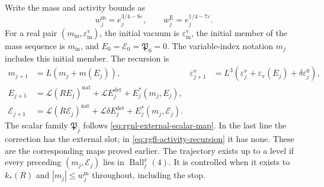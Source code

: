Write the mass and activity bounds as
\[
 w_j^{\mathrm m}=e_j^{3/4-8\varepsilon},\qquad
 w_j^{\mathrm E}=e_j^{1/4-7\varepsilon}.
\]
For a real pair $(m_{\mathrm{in}},\varepsilon_{\mathrm{in}}^{\mathrm v})$,
the initial vacuum is $\varepsilon_{\mathrm{in}}^{\mathrm v}$,
the initial member of the mass sequence is $m_{\mathrm{in}}$,
and $E_0=\mathscr E_0=\mathfrak P_0=0$.
The variable-index notation $m_j$ includes this initial member.
The recursion is
\begin{align}
 m_{j+1}&=L(m_j+m(E_j)),&
 \varepsilon_{j+1}^{\mathrm v}
       &=L^3(\varepsilon_j^{\mathrm v}
                 +\varepsilon_{\mathrm v}(E_j)+\delta\varepsilon_j^0),
                                      \label{eq:rgfl-coupling-recursion}\\
 E_{j+1}&=\mathcal L(RE_j)^{\mathrm{nat}}
                          +\mathcal LE_j^{\mathrm{det}}+E_j^*(m_j,E_j),
                                      \label{eq:rgfl-activity-recursion}\\
 \mathscr E_{j+1}
       &=\mathcal L(R\mathscr E_j)^{\mathrm{nat}}
               +\mathcal L\delta E_j^{\mathrm{det}}
                                      +E_j^*(m_j,\mathscr E_j).
                                      \label{eq:rgfl-slot-recursion}
\end{align}
The scalar family $\mathfrak P_j$ follows
\eqref{eq:rgnl-external-scalar-map}.
In the last line the correction has the external slot;
in \eqref{eq:rgfl-activity-recursion} it has none.
These are the corresponding maps proved earlier.
The trajectory exists up to a level if every preceding
$(m_j,\mathscr E_j)$ lies in $\operatorname{Ball}_j^x(4)$.
It is controlled when it exists to $k_*(R)$ and
$|m_j|\le w_j^{\mathrm m}$ throughout, including the stop.

